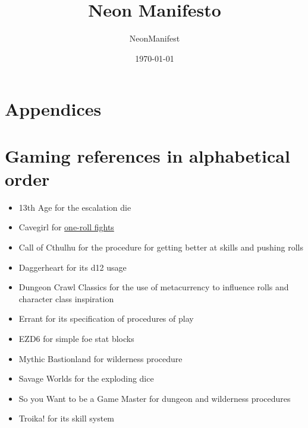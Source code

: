 \documentclass{article}
\title{Neon Manifesto}
\author{NeonManifest}
\date{\today}
\begin{document}
\maketitle

\tableofcontents









\appendix
\section*{Appendices}
\section{Gaming references in alphabetical order}
\begin{itemize}
    \item 13th Age for the escalation die
    \item Cavegirl for \href{https://cavegirlgames.blogspot.com/2018/03/one-roll-fights.html}{one-roll fights}
    \item Call of Cthulhu for the procedure for getting better at skills and pushing rolls
    \item Daggerheart for its d12 usage
    \item Dungeon Crawl Classics for the use of metacurrency to influence rolls and character 
          class inspiration
    \item Errant for its specification of procedures of play
    \item EZD6 for simple foe stat blocks
    \item Mythic Bastionland for wilderness procedure
    \item Savage Worlds for the exploding dice
    \item So you Want to be a Game Master for dungeon and wilderness procedures
    \item Troika! for its skill system
\end{itemize}
\end{document}
